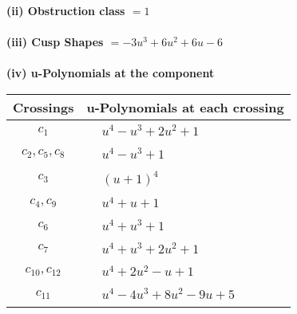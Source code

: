 \documentclass[1p]{elsarticle_modified}
\theoremstyle{definition}
\begin{document}
\flushleft \textbf{(ii) Obstruction class $= 1$}\\~\\
\flushleft \textbf{(iii) Cusp Shapes $= -3 u^3+6 u^2+6 u-6$}\\~\\
\newpage\renewcommand{\arraystretch}{1}
\flushleft \textbf{(iv) u-Polynomials at the component}\newline \\
\begin{tabular}{m{50pt}|m{274pt}}
Crossings & \hspace{64pt}u-Polynomials at each crossing \\
\hline $$\begin{aligned}c_{1}\end{aligned}$$&$\begin{aligned}
&u^4- u^3+2 u^2+1
\end{aligned}$\\
\hline $$\begin{aligned}c_{2},c_{5},c_{8}\end{aligned}$$&$\begin{aligned}
&u^4- u^3+1
\end{aligned}$\\
\hline $$\begin{aligned}c_{3}\end{aligned}$$&$\begin{aligned}
&(u+1)^4
\end{aligned}$\\
\hline $$\begin{aligned}c_{4},c_{9}\end{aligned}$$&$\begin{aligned}
&u^4+u+1
\end{aligned}$\\
\hline $$\begin{aligned}c_{6}\end{aligned}$$&$\begin{aligned}
&u^4+u^3+1
\end{aligned}$\\
\hline $$\begin{aligned}c_{7}\end{aligned}$$&$\begin{aligned}
&u^4+u^3+2 u^2+1
\end{aligned}$\\
\hline $$\begin{aligned}c_{10},c_{12}\end{aligned}$$&$\begin{aligned}
&u^4+2 u^2- u+1
\end{aligned}$\\
\hline $$\begin{aligned}c_{11}\end{aligned}$$&$\begin{aligned}
&u^4-4 u^3+8 u^2-9 u+5
\end{aligned}$\\
\hline
\end{tabular}\\~\\
\end{document}
